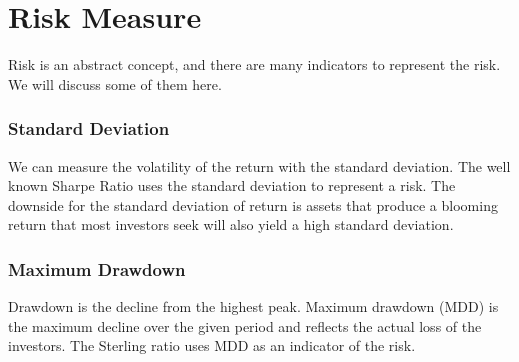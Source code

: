 \section{Risk Measure}
Risk is an abstract concept, and there are many indicators to represent the risk. We will discuss some of them here. 
\subsubsection{Standard Deviation}
We can measure the volatility of the return with the standard deviation. The well known Sharpe Ratio uses the standard deviation to represent a risk. The downside for the standard deviation of return is assets that produce a blooming return that most investors seek will also yield a high standard deviation.
\subsubsection{Maximum Drawdown}
Drawdown is the decline from the highest peak. Maximum drawdown (MDD) is the maximum decline over the given period and reflects the actual loss of the investors. The Sterling ratio uses MDD as an indicator of the risk. 